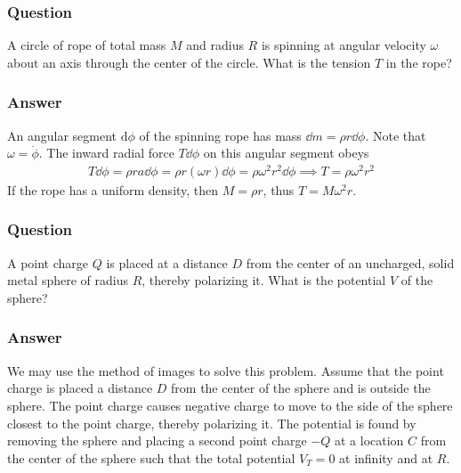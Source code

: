 \subsubsection{Question}

A circle of rope of total mass $M$ and radius $R$ is spinning at angular velocity $\omega$ about an axis through the center of the circle. What is the tension $T$ in the rope?

\subsubsection{Answer}
An angular segment $\text{d}\phi$ of the spinning rope has mass $\dd m = \rho r \dd \phi$. Note that $\omega = \dot{\phi}$. The inward radial force $T\dd\phi$ on this angular segment obeys 
\begin{align*}
	T \dd\phi= \rho r a\dd\phi = \rho r \left(\omega r\right)\dd\phi = \rho \omega^2 r^2\dd\phi \implies \boxed{T = \rho \omega^2 r^2 }
\end{align*}
If the rope has a uniform density, then $M = \rho r$, thus $T = M\omega^2 r$. 

\subsubsection{Question}
A point charge $Q$ is placed at a distance $D$ from the center of an uncharged, solid 
metal sphere of radius $R$, thereby polarizing it. What is the potential $V$ of the sphere?

\subsubsection{Answer}
We may use the method of images to solve this problem. Assume that the point charge is placed a distance $D$ from the center of the sphere and is outside the sphere. The point charge causes negative charge to move to the side of the sphere closest to the point charge, thereby polarizing it. The potential is found by removing the sphere and placing a second point charge $-Q$ at a location $C$ from the center of the sphere such that the total potential $V_T=0$ at infinity and at $R$.

